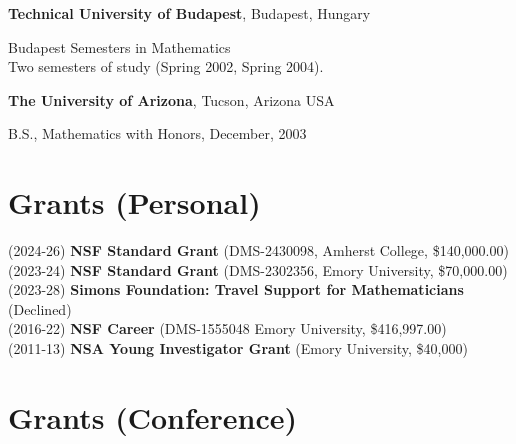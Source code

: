 \documentclass[margin,line]{res}
\newenvironment{list1}{
  \begin{list}{\ding{113}}{%
      \setlength{\itemsep}{0in}
      \setlength{\parsep}{0in} \setlength{\parskip}{0in}
      \setlength{\topsep}{0in} \setlength{\partopsep}{0in}
      \setlength{\leftmargin}{0.17in}}}{\end{list}}
\begin{document}
\begin{resume}
 {\bf Technical University of Budapest}, Budapest, Hungary\\
  \vspace*{-.15in}
  \begin{list1}
  \item[] Budapest Semesters in Mathematics\\
    Two semesters of study (Spring 2002, Spring 2004).
  \end{list1}
\vspace{-7pt}

{\bf The University of Arizona}, Tucson, Arizona USA\\
  \vspace*{-.15in}
  \begin{list1}
  \item[] B.S., Mathematics with Honors, December, 2003\\
  \end{list1}

\vspace{-7pt}
\section{\sc Grants  {(Personal)}}

(2024-26) \textbf{NSF Standard Grant} (DMS-2430098, Amherst College, \$140,000.00) \\
(2023-24) \textbf{NSF Standard Grant} (DMS-2302356, Emory University, \$70,000.00) \\
(2023-28) \textbf{Simons Foundation: Travel Support for Mathematicians} (Declined) \\
(2016-22) \textbf{NSF Career} (DMS-1555048 Emory University, \$416,997.00) \\
(2011-13) \textbf{NSA Young Investigator Grant} (Emory University, \$40,000)\\

\vspace{-7pt}
\section{\sc Grants {(Conference)}}


\end{resume}
\end{document}
